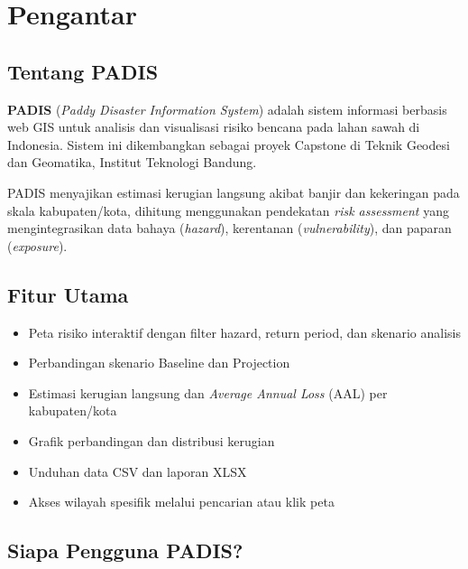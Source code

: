 \documentclass[12pt, a4paper]{article}
\begin{document}
  \tableofcontents
  \newpage

  \section{Pengantar}

  \subsection{Tentang PADIS}

  \textbf{PADIS} (\textit{Paddy Disaster Information System}) adalah sistem informasi
  berbasis web GIS untuk analisis dan visualisasi risiko bencana pada lahan sawah di
  Indonesia. Sistem ini dikembangkan sebagai proyek Capstone di Teknik Geodesi dan
  Geomatika, Institut Teknologi Bandung.

  PADIS menyajikan estimasi kerugian langsung akibat banjir dan kekeringan pada skala
  kabupaten/kota, dihitung menggunakan pendekatan \textit{risk assessment} yang mengintegrasikan
  data bahaya (\textit{hazard}), kerentanan (\textit{vulnerability}), dan paparan (\textit{exposure}).

  \subsection{Fitur Utama}

  \begin{itemize}
    \item Peta risiko interaktif dengan filter hazard, return period, dan skenario analisis
    \item Perbandingan skenario Baseline dan Projection
    \item Estimasi kerugian langsung dan \textit{Average Annual Loss} (AAL) per kabupaten/kota
    \item Grafik perbandingan dan distribusi kerugian
    \item Unduhan data CSV dan laporan XLSX
    \item Akses wilayah spesifik melalui pencarian atau klik peta
  \end{itemize}

  \subsection{Siapa Pengguna PADIS?}
\end{document}
